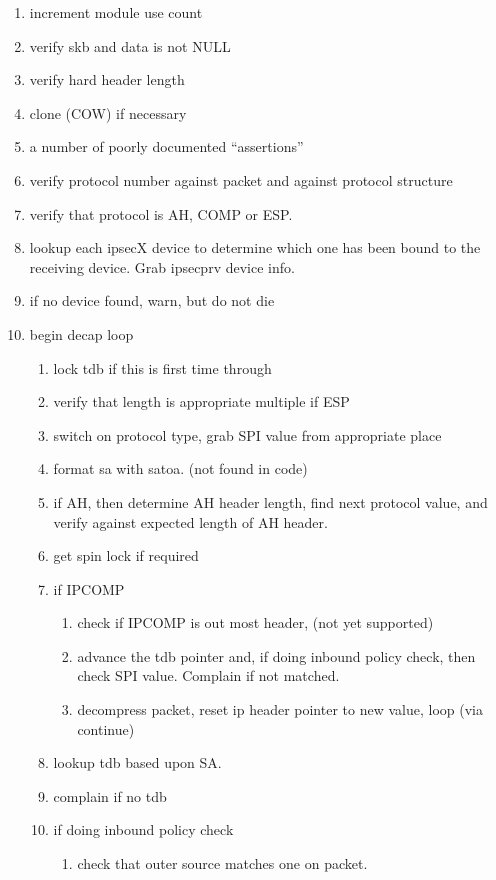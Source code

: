 \begin{enumerate}
	\item increment module use count
	\item verify skb and data is not NULL
	\item verify hard header length
	\item clone (COW) if necessary
	\item a number of poorly documented ``assertions''
	\item verify protocol number against packet and against protocol structure
	\item verify that protocol is AH, COMP or ESP.
	\item lookup each ipsecX device to determine which one has been bound 
		to the receiving device. Grab ipsecprv device info.
	\item if no device found, warn, but do not die
	\item begin decap loop
		\begin{enumerate}
		\item lock tdb if this is first time through
		\item verify that length is appropriate multiple if ESP
		\item switch on protocol type, grab SPI value from appropriate place
		\item format sa with satoa. (not found in code)
		\item if AH, then determine AH header length, find next protocol value, and
			verify against expected length of AH header.
		\item get spin lock if required
		\item if IPCOMP
		\begin{enumerate}
			\item check if IPCOMP is out most header, (not yet supported)
			\item advance the tdb pointer and, if doing inbound policy
				check, then check SPI value. Complain if not matched.
			\item decompress packet, reset ip header pointer to new
				value, loop (via continue) 
		\end{enumerate}
		\item lookup tdb based upon SA. 
		\item complain if no tdb
		\item if doing inbound policy check
		\begin{enumerate}
			\item check that outer source matches one on packet.

\end{enumerate}
\end{enumerate}
\end{enumerate}
